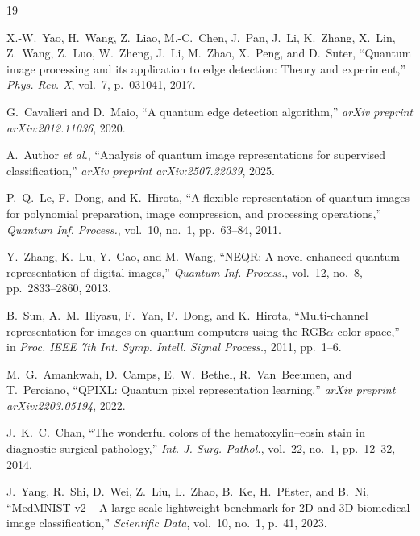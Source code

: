 \documentclass[conference,compsoc]{IEEEtran}
\begin{document}
\begin{thebibliography}{19}

X.-W.~Yao, H.~Wang, Z.~Liao, M.-C.~Chen, J.~Pan, J.~Li, K.~Zhang, X.~Lin, Z.~Wang, Z.~Luo, W.~Zheng, J.~Li, M.~Zhao, X.~Peng, and D.~Suter,
``Quantum image processing and its application to edge detection: Theory and experiment,''
\emph{Phys. Rev. X}, vol.~7, p.~031041, 2017.

G.~Cavalieri and D.~Maio,
``A quantum edge detection algorithm,''
\emph{arXiv preprint arXiv:2012.11036}, 2020.

A.~Author \emph{et al.},
``Analysis of quantum image representations for supervised classification,''
\emph{arXiv preprint arXiv:2507.22039}, 2025.

P.~Q.~Le, F.~Dong, and K.~Hirota,
``A flexible representation of quantum images for polynomial preparation, image compression, and processing operations,''
\emph{Quantum Inf. Process.}, vol.~10, no.~1, pp.~63--84, 2011.

Y.~Zhang, K.~Lu, Y.~Gao, and M.~Wang,
``{NEQR}: A novel enhanced quantum representation of digital images,''
\emph{Quantum Inf. Process.}, vol.~12, no.~8, pp.~2833--2860, 2013.

B.~Sun, A.~M.~Iliyasu, F.~Yan, F.~Dong, and K.~Hirota,
``Multi-channel representation for images on quantum computers using the {RGB}$\alpha$ color space,''
in \emph{Proc. IEEE 7th Int. Symp. Intell. Signal Process.}, 2011, pp.~1--6.

M.~G.~Amankwah, D.~Camps, E.~W.~Bethel, R.~Van~Beeumen, and T.~Perciano,
``{QPIXL}: Quantum pixel representation learning,''
\emph{arXiv preprint arXiv:2203.05194}, 2022.

J.~K.~C.~Chan,
``The wonderful colors of the hematoxylin--eosin stain in diagnostic surgical pathology,''
\emph{Int. J. Surg. Pathol.}, vol.~22, no.~1, pp.~12--32, 2014.

J.~Yang, R.~Shi, D.~Wei, Z.~Liu, L.~Zhao, B.~Ke, H.~Pfister, and B.~Ni,
``{MedMNIST} v2 -- A large-scale lightweight benchmark for 2{D} and 3{D} biomedical image classification,''
\emph{Scientific Data}, vol.~10, no.~1, p.~41, 2023.


\end{thebibliography}
\end{document}
